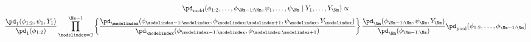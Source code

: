 \begin{multline}
  \pd_{\text{meld}}(\phi_{1:2}, \ldots, \phi_{\Nm - 1:\Nm}, \psi_{1}, \ldots, \psi_{\Nm} \mid Y_{1}, \ldots, Y_{\Nm}) \propto \\ 
  \frac {
      \pd_{1} (\phi_{1:2}, \psi_{1}, Y_{1})
    } {
      \pd_{1}(\phi_{1:2})
    }
  \prod_{\modelindex = 2}^{\Nm - 1} \left\{
    \frac {
      \pd_{\modelindex} (\phi_{\modelindex - 1:\modelindex}, \phi_{\modelindex:\modelindex + 1}, \psi_{\modelindex}, Y_{\modelindex})
    } {
      \pd_{\modelindex}(\phi_{\modelindex - 1:\modelindex}, \phi_{\modelindex:\modelindex + 1})
    }
  \right\}
  \frac {
    \pd_{\Nm} (\phi_{\Nm - 1:\Nm}, \psi_{\Nm}, Y_{\Nm})
  } {
    \pd_{\Nm}(\phi_{\Nm - 1:\Nm})
  }
  \pd_{\text{pool}}(\phi_{1:2}, \ldots, \phi_{\Nm - 1:\Nm}) 
  \label{eqn:stage-Mplus1-target}
\end{multline}